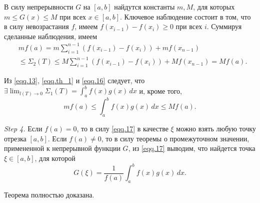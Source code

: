 В силу непрерывности $G$ на $[a,b]$ найдутся константы $m,M$, для которых $m \le G(x) \le M$ при всех $x \in [a,b]$.
Ключевое наблюдение состоит в том, что в силу невозрастания $f$, имеем $f(x_{i-1})-f(x_{i}) \geq 0$ при всех $i$.
Суммируя сделанные наблюдения, имеем
\begin{equation}
\label{eqq.16}
\begin{split}
&mf(a) = m \sum\limits_{i=1}^{n-1}(f(x_{i-1})-f(x_{i})) + mf(x_{n-1})\\ 
&\le  \Sigma_2(T) \le M \sum\limits_{i=1}^{n-1}(f(x_{i-1})-f(x_{i})) + Mf(x_{n-1}) = Mf(a).
\end{split}
\end{equation}

Из \eqref{eqq.13}, \eqref{eqq.th_1} и \eqref{eqq.16} следует, что $\exists \lim_{l(T) \to 0}\Sigma_{1}(T) = \int_{a}^{b}f(x)g(x)\,dx$ и, кроме того,
\begin{equation}
\label{eqq.17}
mf(a) \le \int_{a}^{b}f(x)g(x)\,dx \le Mf(a).
\end{equation}

\textit{Step 4.} Если $f(a) = 0$, то в силу \eqref{eqq.17} в качестве $\xi$ можно взять любую точку отрезка $[a,b]$. Если $f(a) \neq 0$, то в силу теоремы о промежуточном значении, примененной 
к непрерывной функции $G$, из \eqref{eqq.17} выводим, что найдется точка $\xi \in [a,b]$, для которой 
\begin{equation}
G(\xi) = \frac{1}{f(a)}\int_{a}^{b}f(x)g(x)\,dx.
\end{equation}

Теорема полностью доказана.
